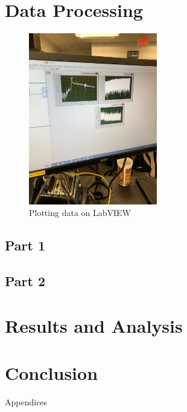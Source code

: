 \documentclass{article}
\begin{document}
\section{Data Processing}
\begin{figure}[H]
\centering
\includegraphics[width=0.5\textwidth, angle = -90]{Lab 2/lab2images/labview_plots.jpg}
\caption{Plotting data on LabVIEW}
\end{figure}

\subsection{Part 1}


\subsection{Part 2}


\section{Results and Analysis}



\section{Conclusion}




\newpage
\thispagestyle{empty}  %
\begin{center}
	\vspace*{\fill}
	{\Huge Appendices}
	\vspace*{\fill}
\end{center}
\end{document}
